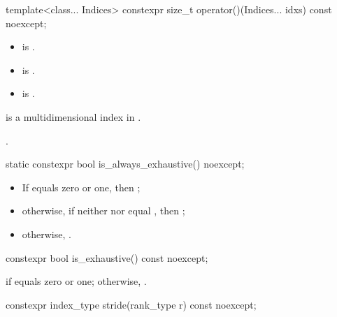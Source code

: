 \begin{itemdecl}
template<class... Indices>
constexpr size_t operator()(Indices... idxs) const noexcept;
\end{itemdecl}

\begin{itemdescr}
\pnum
\constraints
\begin{itemize}
\item
{} is .
\item
{} is .
\item
{} is .
\end{itemize}

\pnum
\expects
{} is
a multidimensional index in .

\pnum
\returns
{}.
\end{itemdescr}

\begin{itemdecl}
static constexpr bool is_always_exhaustive() noexcept;
\end{itemdecl}

\begin{itemdescr}
\pnum
\returns
\begin{itemize}
\item
If  equals zero or one, then ;
\item
otherwise, if
neither  nor 
equal ,
then ;
\item
otherwise, .
\end{itemize}
\end{itemdescr}

\begin{itemdecl}
constexpr bool is_exhaustive() const noexcept;
\end{itemdecl}

\begin{itemdescr}
\pnum
\returns
{} if  equals zero or one;
otherwise, .
\end{itemdescr}

\begin{itemdecl}
constexpr index_type stride(rank_type r) const noexcept;
\end{itemdecl}

